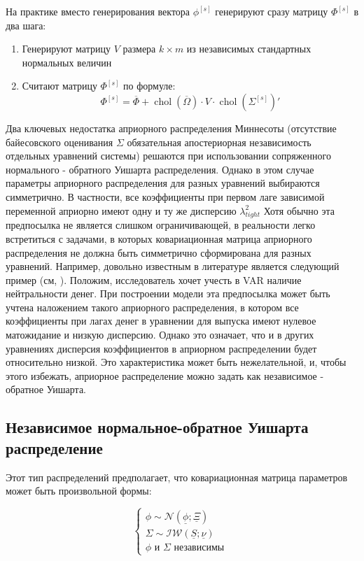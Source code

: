 \documentclass[11pt]{article} %
\DeclareMathOperator{\chol}{chol}
\newcommand{\cN}{\mathcal{N}}
\newcommand{\cIW}{\mathcal{IW}}
\newcommand{\prior}{\underline}
\newcommand{\post}{\overline}
\begin{document}
На практике вместо генерирования вектора $\phi^{[s]}$ генерируют сразу матрицу $\Phi^{[s]}$ в два шага:

\begin{enumerate}
\item Генерируют матрицу $V$ размера $k\times m$  из независимых стандартных нормальных величин
\item Считают матрицу $\Phi^{[s]}$ по формуле:
\[
\Phi^{[s]} = \post \Phi + \chol(\post\Omega) \cdot V \cdot \chol(\Sigma^{[s]})'
\]
\end{enumerate}

Два ключевых недостатка априорного распределения Миннесоты (отсутствие байесовского оценивания $\Sigma$ обязательная апостериорная независимость отдельных уравнений системы) решаются при использовании сопряженного нормального  - обратного Уишарта распределения. Однако в этом случае параметры априорного распределения для разных уравнений выбираются симметрично. В частности, все коэффициенты при первом лаге зависимой переменной априорно имеют одну и ту же дисперсию $\lambda_{tight}^2$  Хотя обычно эта предпосылка не является слишком ограничивающей, в реальности легко встретиться с задачами, в которых ковариационная матрица априорного распределения не должна быть симметрично сформирована для разных уравнений. Например, довольно известным в литературе является следующий пример (см, \cite{kadiyala_karlsson_1997}). Положим, исследователь хочет  учесть в VAR наличие нейтральности денег. При построении модели эта предпосылка может быть учтена наложением такого априорного распределения, в котором все коэффициенты при лагах денег в уравнении для выпуска имеют нулевое матожидание и низкую дисперсию. Однако это означает, что и в других уравнениях дисперсия коэффициентов в априорном распределении будет относительно низкой. Это характеристика может быть нежелательной, и, чтобы этого избежать,   априорное распределение можно задать как независимое - обратное Уишарта. 

\subsection{Независимое нормальное-обратное Уишарта распределение}

Этот тип распределений предполагает, что ковариационная матрица параметров может быть произвольной формы: 

\begin{equation}
\begin{cases}
\phi \sim \cN(\prior\phi; \prior\Xi ) \\
\Sigma \sim \cIW(\prior S; \prior\nu) \\
\phi \text{ и } \Sigma \text{ независимы }
\end{cases}
\end{equation}
\end{document}
